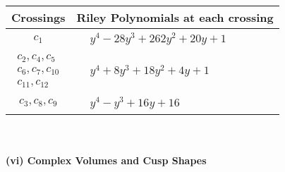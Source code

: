 \documentclass[1p]{elsarticle_modified}
\theoremstyle{definition}
\begin{document}
\begin{tabular}{m{50pt}|m{274pt}}
Crossings & \hspace{64pt}Riley Polynomials at each crossing \\
\hline $$\begin{aligned}c_{1}\end{aligned}$$&$\begin{aligned}
&y^4-28 y^3+262 y^2+20 y+1
\end{aligned}$\\
\hline $$\begin{aligned}c_{2},c_{4},c_{5}\\c_{6},c_{7},c_{10}\\c_{11},c_{12}\end{aligned}$$&$\begin{aligned}
&y^4+8 y^3+18 y^2+4 y+1
\end{aligned}$\\
\hline $$\begin{aligned}c_{3},c_{8},c_{9}\end{aligned}$$&$\begin{aligned}
&y^4- y^3+16 y+16
\end{aligned}$\\
\hline
\end{tabular}\\~\\
\newpage\flushleft \textbf{(vi) Complex Volumes and Cusp Shapes}
\end{document}
